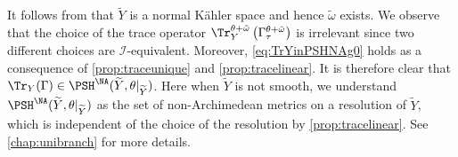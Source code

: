 It follows from \cite[Proposition~3.6]{GK20} that $\widetilde{Y}$ is a normal K\"ahler space and hence $\tilde{\omega}$ exists. We observe that the choice of the trace operator $\Tr_Y^{\theta+\tilde{\omega}}\left(\Gamma^{\theta+\tilde{\omega}}_{\tau}\right)$ is irrelevant since two different choices are $\mathcal{I}$-equivalent. Moreover, \eqref{eq:TrYinPSHNAg0} holds as a consequence of \cref{prop:traceunique} and \cref{prop:tracelinear}. It is therefore clear that $\Tr_Y(\Gamma)\in \PSH^{\NA}(\widetilde{Y},\theta|_{\widetilde{Y}})$. Here when $\widetilde{Y}$ is not smooth, we understand $\PSH^{\NA}(\widetilde{Y},\theta|_{\widetilde{Y}})$ as the set of non-Archimedean metrics on a resolution of $\widetilde{Y}$, which is independent of the choice of the resolution by \cref{prop:tracelinear}. See \cref{chap:unibranch} for more details.

